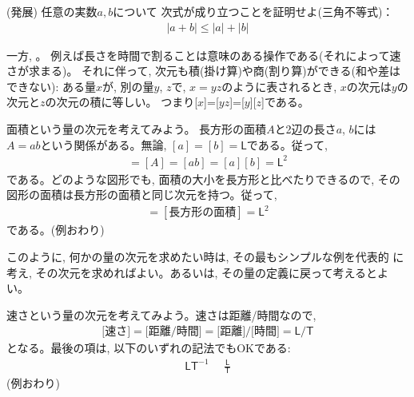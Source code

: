 \begin{q}\label{q:alg_ineq3} (発展) 任意の実数$a, b$について
次式が成り立つことを証明せよ(三角不等式)：
\begin{eqnarray}
|a+b|\leq|a|+|b|
\end{eqnarray}
\end{q}


一方, 。
例えば長さを時間で割ることは意味のある操作である(それによって速さが求まる)。
それに伴って, 次元も積(掛け算)や商(割り算)ができる{\small (和や差はできない)}: 
ある量$x$が, 別の量$y$, $z$で, $x=yz$のように表されるとき, $x$の次元は$y$の次元と$z$の次元の積に等しい。
つまり[$x$]=[$yz$]=[$y$][$z$]である。\\

\begin{exmpl} 面積という量の次元を考えてみよう。
長方形の面積$A$と2辺の長さ$a$, $b$には$A=ab$という関係がある。無論, 
$[a]=[b]=\mathsf{L}$である。従って, 
\begin{eqnarray}[\text{長方形の面積}]=[A]=[ab]=[a][b]=\mathsf{L}^2\end{eqnarray}
である。どのような図形でも, 面積の大小を長方形と比べたりできるので, 
その図形の面積は長方形の面積と同じ次元を持つ。従って, 
\begin{eqnarray}[\text{面積}]=[\text{長方形の面積}]=\mathsf{L}^2\end{eqnarray}
である。(例おわり)
\end{exmpl}\mv

このように, 何かの量の次元を求めたい時は, その最もシンプルな例を代表的
に考え, その次元を求めればよい。あるいは, その量の定義に戻って考えるとよい。

\begin{exmpl} 速さという量の次元を考えてみよう。速さは距離/時間なので, 
\begin{eqnarray*}
\text{[速さ]}=\text{[距離/時間]}=\text{[距離]/[時間]}=\mathsf{L}/\mathsf{T}
\end{eqnarray*}
となる。最後の項は, 以下のいずれの記法でもOKである:
\begin{eqnarray*}
\mathsf{LT}^{-1}\,\,\,\,\,\,\,\,\frac{\mathsf{L}}{\mathsf{T}}
\end{eqnarray*}
(例おわり)\end{exmpl}

